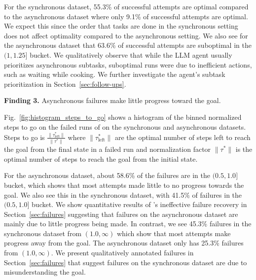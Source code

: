 For the synchronous dataset, 55.3\% of successful attempts are optimal compared to the asynchronous dataset where only 9.1\% of successful attempts are optimal. We expect this since the order that tasks are done in the synchronous setting does not affect optimality compared to the asynchronous setting. We also see for the asynchronous dataset that 63.6\% of successful attempts are suboptimal in the $(1, 1.25]$ bucket. We qualitatively observe that while the LLM agent usually prioritizes asynchronous subtasks, suboptimal runs were due to inefficient actions, such as waiting while cooking. We further investigate the agent's subtask prioritization in Section~\ref{sec:follow-ups}.



\textbf{Finding 3.} Asynchronous failures make little progress toward the goal.

Fig.~\ref{fig:histogram_steps_to_go} shows a histogram of the binned normalized steps to go on the failed runs of \gptfo{} \react{} on the synchronous and asynchronous datasets. Steps to go is $\frac{\|\tau^*_{\text{left}}\|}{\|\tau^*\|}$ where $\|\tau^*_{\text{left}}\|$ are the optimal number of steps left to reach the goal from the final state in a failed run and normalization factor $\|\tau^*\|$ is the optimal number of steps to reach the goal from the initial state.




For the asynchronous dataset, about 58.6\% of the failures are in the $(0.5, 1.0]$ bucket, which shows that most attempts made little to no progress towards the goal. We also see this in the synchronous dataset, with 41.5\% of failures in the $(0.5, 1.0]$ bucket. We show quantitative results of \gptfo{} \react{}'s ineffective failure recovery in Section~\ref{sec:failures} suggesting that failures on the asynchronous dataset are mainly due to little progress being made. In contrast, we see 45.3\% failures in the synchronous dataset from $(1.0, \infty)$ which show that most attempts make progress away from the goal. The asynchronous dataset only has 25.3\% failures from $(1.0, \infty)$. We present qualitatively annotated failures in Section~\ref{sec:failures} that suggest failures on the synchronous dataset are due to misunderstanding the goal. 